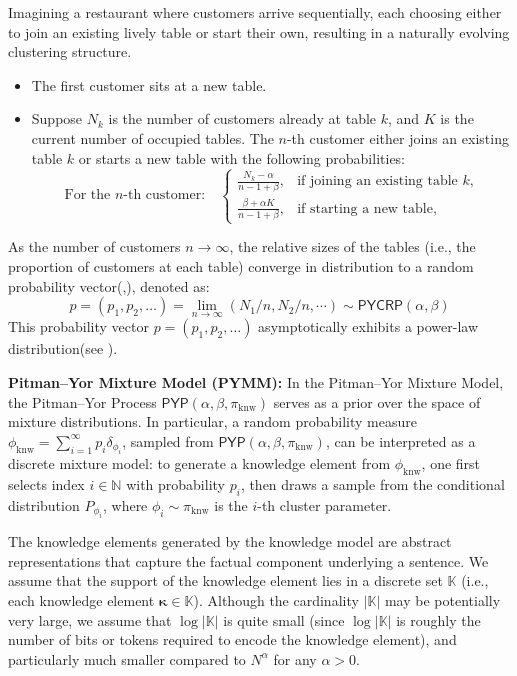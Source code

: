 \documentclass[11pt]{article}
\theoremstyle{plain}
\theoremstyle{definition}
\newcommand{\knwModel}{\phi_{\text{knw}}}
\newcommand{\knwset}{\mathbb{K}}
\newcommand{\PYP}{\mathsf{PYP}}
\newcommand{\PYCRP}{\mathsf{PYCRP}}
\newcommand{\basemeasure}{\pi_{\text{knw}}}
\newcommand{\Knwelem}{\boldsymbol{\kappa}}
\newcommand{\jian}[1]{{\it \color{red}{Jian: #1}}}
\newcommand{\zhixuan}[1]{{\it \color{blue}{zhixuan: #1}}}
\begin{document}
Imagining a restaurant where customers arrive sequentially, each choosing either to join an existing lively table or start their own, resulting in a naturally evolving clustering structure.

\begin{itemize}
    \item The first customer sits at a new table.
    \item 
Suppose \( N_k \) is the number of customers already at table \( k \), and \( K \) is the current number of occupied tables.
The \( n \)-th customer either joins an existing table \(k\) or starts a new table with the following probabilities:
\[
\text{For the \(n\)-th customer:} \quad
\begin{cases}
\displaystyle \frac{N_k - \alpha}{n - 1 + \beta}, & \text{if joining an existing table \(k\),}\\[10pt]
\displaystyle \frac{\beta + \alpha K}{n - 1 + \beta}, & \text{if starting a new table,}
\end{cases}
\]
\end{itemize}
As the number of customers \( n \to \infty \), the relative sizes of the tables (i.e., the proportion of customers at each table) converge in distribution to a random probability vector(\cite{pitman2006combinatorial},), denoted as:
\[
p=(p_1, p_2, \dots)=\lim\limits_{n\to \infty}(N_1/n,N_2/n,\cdots) \sim \PYCRP(\alpha, \beta)
\]
This probability vector $p=(p_1, p_2, \dots)$ asymptotically exhibits a power-law distribution(see ).

\noindent
{\bf Pitman–Yor Mixture Model (PYMM):}
In the Pitman–Yor Mixture Model, the Pitman–Yor Process  
\( \PYP(\alpha, \beta, \basemeasure) \) 
serves as a prior over the space of mixture distributions. 
In particular, a random probability measure 
\( \knwModel = \sum_{i=1}^{\infty} p_i \delta_{\phi_i} \), 
sampled from \( \PYP(\alpha, \beta, \basemeasure) \), 
can be interpreted as a discrete mixture model: to generate a knowledge element from \( \knwModel \), 
one first selects index \( i \in \mathbb{N} \) with probability \( p_i \), 
then draws a sample from the conditional distribution \( P_{\phi_i} \), 
where \( \phi_i \sim \basemeasure \) is the $i$-th cluster parameter.

The knowledge elements generated by the knowledge model are abstract representations that capture the factual component underlying a sentence. 
We assume that the support of the knowledge element lies in a discrete set \( \knwset \) (i.e., each knowledge element
$\Knwelem\in \knwset$). 
Although the cardinality \( |\knwset| \) may be potentially very large, we assume that \( \log |\knwset| \) 
is quite small (since \( \log |\knwset| \) is roughly the number of bits or tokens required to encode the knowledge element), and particularly much smaller compared to \( N^\alpha \) for any $\alpha>0$.
\end{document}
